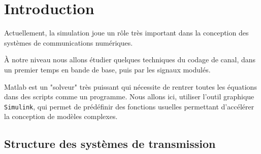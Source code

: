 \documentclass[11pt, openright]{book}
\begin{document}




\newpage

\section{Introduction}
Actuellement, la simulation joue un rôle très important dans la conception des systèmes
de communications numériques.

À notre niveau nous allons étudier quelques techniques du codage de canal, dans un
premier temps en bande de base, puis par les signaux modulés.

Matlab est un "solveur" très puissant qui nécessite de rentrer toutes les équations
dans des scripts comme un programme. Nous allons ici, utiliser l’outil graphique \texttt{Simulink}, qui
permet de prédéfinir des fonctions usuelles permettant d’accélérer la conception de modèles
complexes.

\subsection{Structure des systèmes de transmission}
\end{document}
